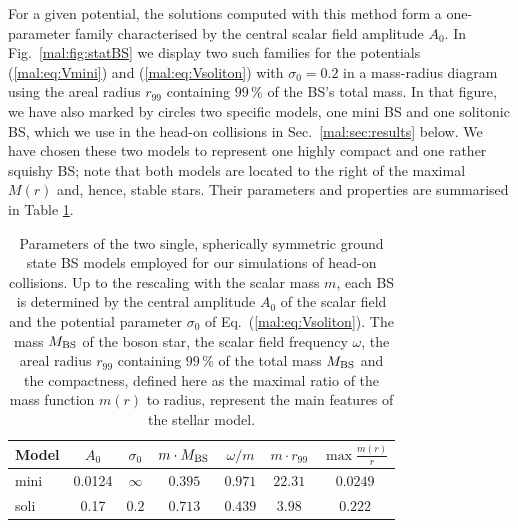 For a given potential, the solutions computed with this method
form a one-parameter family characterised
by the central scalar field amplitude ${A}_0$. In
Fig.~\ref{mal:fig:statBS} we display two such families for the
potentials (\ref{mal:eq:Vmini}) and (\ref{mal:eq:Vsoliton}) with ${\sigma}_0=0.2$ in a
mass-radius diagram using the areal radius ${r}_{99}$ containing
$99\,\%$ of the BS's total mass. In that figure, we have also marked
by circles two specific models, one mini BS and one solitonic BS,
which we use in the head-on collisions in Sec.~\ref{mal:sec:results} below.
We have chosen these two models to represent one highly compact and
one rather squishy BS; note that both models are located
to the right of the maximal ${M}({r})$ and, hence, stable stars.
Their parameters and properties are summarised in Table
\ref{mal:tab:models}.
%
\begin{table}
    \centering
    \begin{tabular}{l|cccccc}
    \hline
    Model & $A_0$ & $\sigma_0$ & $m\cdot M_{\rm BS}$ & $\omega/m$ & $m \cdot r_{99}$ & $\max\frac{m(r)}{r}$  \\
    \hline
    mini & 0.0124 & $\infty$ & $0.395$ & $0.971$ & $22.31$ & $0.0249$ \\
    soli & 0.17 & $0.2$ & $0.713$ & $0.439$ & $3.98$ & $0.222$ \\
    \hline
    \end{tabular}
    \caption{Parameters of the two single, spherically symmetric
    ground state BS models employed for our simulations of
    head-on collisions. Up to the rescaling with the scalar mass
    $m$, each BS is determined by the central amplitude
    $A_0$ of the scalar field and the potential parameter
    $\sigma_0$ of Eq.~(\ref{mal:eq:Vsoliton}). The mass $M_{\rm BS}$ of the boson star,
    the scalar field frequency $\omega$, the areal radius $r_{99}$ containing
    $99\,\%$ of the total mass $M_{\rm BS}$ and the compactness, defined here
    as the maximal ratio of the mass function $m(r)$ to radius, represent
    the main features of the stellar model.}
    \label{mal:tab:models}
\end{table}
%







